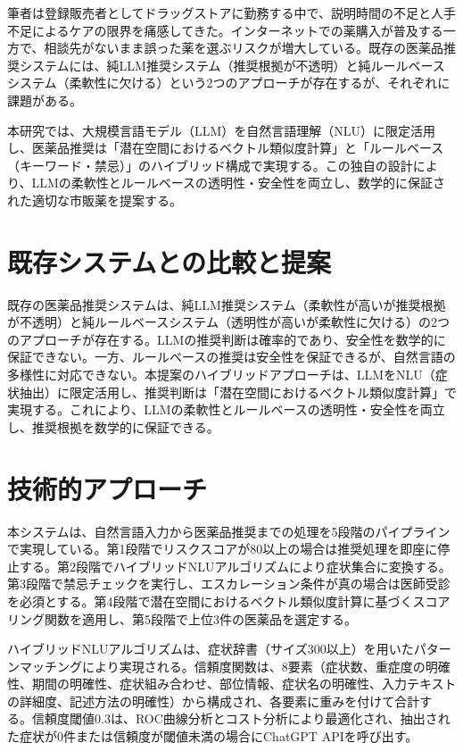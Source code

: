 \documentclass[a4paper,11pt]{bxjsarticle}
\theoremstyle{definition}
\begin{document}
筆者は登録販売者としてドラッグストアに勤務する中で、説明時間の不足と人手不足によるケアの限界を痛感してきた。インターネットでの薬購入が普及する一方で、相談先がないまま誤った薬を選ぶリスクが増大している。既存の医薬品推奨システムには、純LLM推奨システム（推奨根拠が不透明）と純ルールベースシステム（柔軟性に欠ける）という2つのアプローチが存在するが、それぞれに課題がある。

本研究では、大規模言語モデル（LLM）を自然言語理解（NLU）に限定活用し、医薬品推奨は「潜在空間におけるベクトル類似度計算」と「ルールベース（キーワード・禁忌）」のハイブリッド構成で実現する。この独自の設計により、LLMの柔軟性とルールベースの透明性・安全性を両立し、数学的に保証された適切な市販薬を提案する。

\section{既存システムとの比較と提案}

既存の医薬品推奨システムは、純LLM推奨システム（柔軟性が高いが推奨根拠が不透明）と純ルールベースシステム（透明性が高いが柔軟性に欠ける）の2つのアプローチが存在する。LLMの推奨判断は確率的であり、安全性を数学的に保証できない。一方、ルールベースの推奨は安全性を保証できるが、自然言語の多様性に対応できない。本提案のハイブリッドアプローチは、LLMをNLU（症状抽出）に限定活用し、推奨判断は「潜在空間におけるベクトル類似度計算」で実現する。これにより、LLMの柔軟性とルールベースの透明性・安全性を両立し、推奨根拠を数学的に保証できる。

\section{技術的アプローチ}

本システムは、自然言語入力から医薬品推奨までの処理を5段階のパイプラインで実現している。第1段階でリスクスコアが80以上の場合は推奨処理を即座に停止する。第2段階でハイブリッドNLUアルゴリズムにより症状集合に変換する。第3段階で禁忌チェックを実行し、エスカレーション条件が真の場合は医師受診を必須とする。第4段階で潜在空間におけるベクトル類似度計算に基づくスコアリング関数を適用し、第5段階で上位3件の医薬品を選定する。

ハイブリッドNLUアルゴリズムは、症状辞書（サイズ300以上）を用いたパターンマッチングにより実現される。信頼度関数は、8要素（症状数、重症度の明確性、期間の明確性、症状組み合わせ、部位情報、症状名の明確性、入力テキストの詳細度、記述方法の明確性）から構成され、各要素に重みを付けて合計する。信頼度閾値0.3は、ROC曲線分析とコスト分析により最適化され、抽出された症状が0件または信頼度が閾値未満の場合にChatGPT APIを呼び出す。
\end{document}
